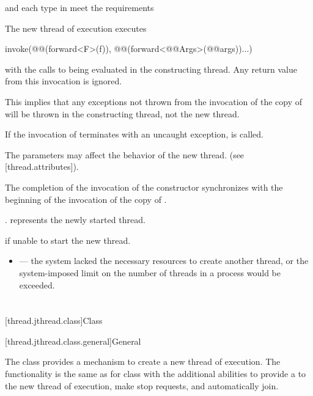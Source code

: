 \documentclass{wg21}
\begin{document}
\begin{itemdescr}
\pnum
\expects
{} and each type in  meet the
 requirements

\pnum
\effects
The new thread of execution executes
\begin{codeblock}
    invoke(@@(forward<F>(f)), @@(forward<@@Args>(@@args))...)
\end{codeblock}
with the calls to
 being evaluated in the constructing thread.
Any return value from this invocation is ignored.
\begin{note}
    This implies that any exceptions not thrown from the invocation of the copy
    of  will be thrown in the constructing thread, not the new thread.
\end{note}
If the invocation of  terminates with an uncaught exception,
 is called.

\begin{addedblock}
The parameters  may affect the behavior of the new thread. (see [thread.attributes]).
\end{addedblock}

\pnum
\sync
The completion of the invocation of the constructor
synchronizes with the beginning of the invocation of the copy of .

\pnum
\ensures
{}.  represents the newly started thread.

\pnum
\throws
{} if unable to start the new thread.

\pnum
\errors
\begin{itemize}
    \item {} --- the system lacked the necessary
    resources to create another thread, or the system-imposed limit on the number of
    threads in a process would be exceeded.
\end{itemize}
\end{itemdescr}

\section{}

[thread.jthread.class]{Class }

[thread.jthread.class.general]{General}

\pnum
The class  provides a mechanism
to create a new thread of execution.
The functionality is the same as for
class 
with the additional abilities to provide
a  to the new thread of execution,
make stop requests, and automatically join.
\end{document}
